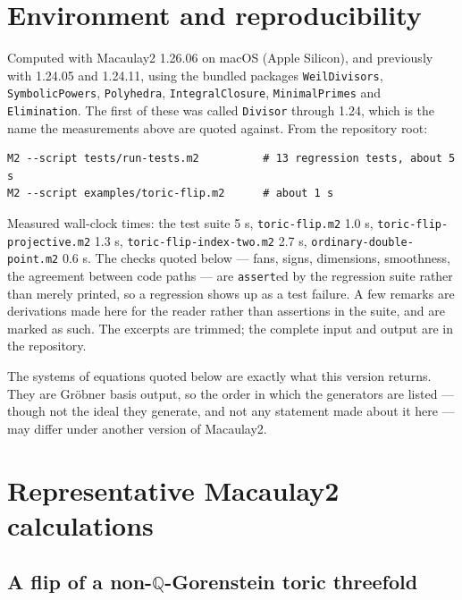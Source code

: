 \documentclass[11pt,reqno]{amsart}
\newcommand{\QQ}{\ensuremath{\mathbb{Q}}}
\theoremstyle{plain}
\theoremstyle{definition}
\begin{document}
\section{Environment and
reproducibility}\label{environment-and-reproducibility}

Computed with Macaulay2 1.26.06 on macOS (Apple Silicon), and previously
with 1.24.05 and 1.24.11, using the bundled packages
\texttt{WeilDivisors}, \texttt{SymbolicPowers}, \texttt{Polyhedra},
\texttt{IntegralClosure}, \texttt{MinimalPrimes} and
\texttt{Elimination}. The first of these was called \texttt{Divisor}
through 1.24, which is the name the measurements above are quoted
against. From the repository root:

\begin{verbatim}
M2 --script tests/run-tests.m2          # 13 regression tests, about 5 s
M2 --script examples/toric-flip.m2      # about 1 s
\end{verbatim}

Measured wall-clock times: the test suite 5 s, \texttt{toric-flip.m2}
1.0 s, \texttt{toric-flip-projective.m2} 1.3 s,
\texttt{toric-flip-index-two.m2} 2.7 s,
\texttt{ordinary-double-point.m2} 0.6 s. The checks quoted below ---
fans, signs, dimensions, smoothness, the agreement between code paths
--- are \texttt{assert}ed by the regression suite rather than merely
printed, so a regression shows up as a test failure. A few remarks are
derivations made here for the reader rather than assertions in the
suite, and are marked as such. The excerpts are trimmed; the complete
input and output are in the repository.

The systems of equations quoted below are exactly what this version
returns. They are Gr\"obner basis output, so the order in which the
generators are listed --- though not the ideal they generate, and not
any statement made about it here --- may differ under another version of
Macaulay2.

\section{Representative Macaulay2
calculations}\label{representative-macaulay2-calculations}

\subsection{A flip of a non-\QQ{}-Gorenstein toric
threefold}\label{a-flip-of-a-non-ux211a-gorenstein-toric-threefold}
\end{document}
